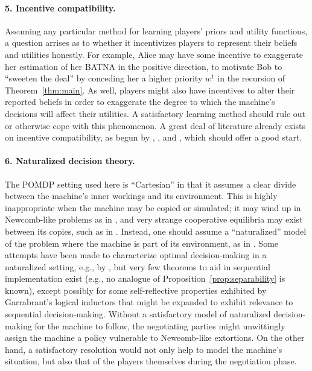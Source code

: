 \documentclass{article}
\newcommand{\thm}[1]{Theorem~\ref{thm:#1}}
\newcommand{\prop}[1]{Proposition~\ref{prop:#1}}
\begin{document}
\paragraph{5. Incentive compatibility.}  Assuming any particular method for learning players' priors and utility functions, a question arrises as to whether it incentivizes players to represent their beliefs and utilities honestly.  For example, Alice  may have some incentive to exaggerate her estimation of her BATNA in the positive direction, to motivate Bob to ``sweeten the deal'' by conceding her a higher priority $w^1$ in the recursion of \thm{main}.  As well, players might also have incentives to alter their reported beliefs in order to exaggerate the degree to which the machine's decisions will affect their utilities.  A satisfactory learning method should rule out or otherwise cope with this phenomenon.  A great deal of literature already exists on incentive compatibility, as begun by \citet{hurwicz1972informationally}, \citet{myerson1979incentive}, and \citet{myerson1983efficient}, which should offer a good start.


\paragraph{6. Naturalized decision theory.} The POMDP setting used here is ``Cartesian'' in that it assumes a clear divide between the machine's inner workings and its environment.  This is highly inappropriate when the machine may be copied or simulated; it may wind up in Newcomb-like problems as in \citet{soares2015toward}, and very strange cooperative equilibria may exist between its copies, such as in \citet{critch2016parametric}.  Instead, one should assume a ``naturalized'' model of the problem where the machine is part of its environment, as in \citet{fallenstein2015reflective}.  Some attempts have been made to characterize optimal decision-making in a naturalized setting, e.g., by  \citet{orseau2012space}, but very few theorems to aid in sequential implementation exist (e.g., no analogue of \prop{separability} is known), except possibly for some self-reflective properties exhibited by Garrabrant's logical inductors \citep{garrabrant2016logical} that might be expanded to exhibit relevance to sequential decision-making.   Without a satisfactory model of naturalized decision-making for the machine to follow, the negotiating parties might unwittingly assign the machine a policy vulnerable to Newcomb-like extortions.  On the other hand, a satisfactory resolution would not only help to model the machine's situation, but also that of the players themselves during the negotiation phase.
\end{document}
